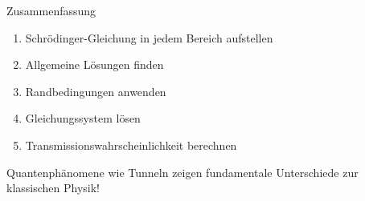 \documentclass{beamer}
\begin{document}
    \begin{frame}{Zusammenfassung}
        \begin{enumerate}
            \item Schrödinger-Gleichung in jedem Bereich aufstellen
            \item Allgemeine Lösungen finden
            \item Randbedingungen anwenden
            \item Gleichungssystem lösen
            \item Transmissionswahrscheinlichkeit berechnen
        \end{enumerate}

        Quantenphänomene wie Tunneln zeigen fundamentale Unterschiede zur klassischen Physik!
    \end{frame}
\end{document}
